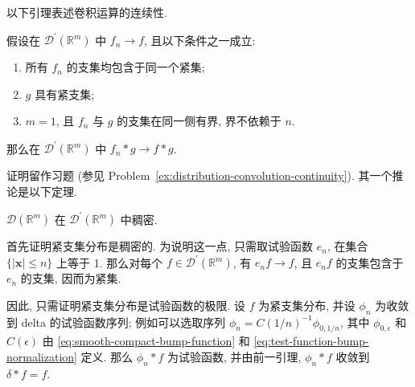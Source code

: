 以下引理表述卷积运算的连续性.

\begin{Lemma}
\label{lem:distribution-convolution-continuity}
假设在 $\mathcal{D}^{\prime}(\mathbb{R}^m)$ 中 $f_n\to f$, 且以下条件之一成立:
\begin{enumerate}
\item 所有 $f_n$ 的支集均包含于同一个紧集;
\item $g$ 具有紧支集;
\item $m=1$, 且 $f_n$ 与 $g$ 的支集在同一侧有界, 界不依赖于 $n$.
\end{enumerate}
那么在 $\mathcal{D}^{\prime}(\mathbb{R}^m)$ 中 $f_n*g\to f*g$.
\end{Lemma}

证明留作习题 (参见 Problem~\ref{ex:distribution-convolution-continuity}). 其一个推论是以下定理.

\begin{Theorem}
\label{thm:test-functions-dense-distributions}
$\mathcal{D}(\mathbb{R}^m)$ 在 $\mathcal{D}^{\prime}(\mathbb{R}^m)$ 中稠密.
\end{Theorem}

\begin{Proof}
首先证明紧支集分布是稠密的. 为说明这一点, 只需取试验函数 $e_n$, 在集合 $\{|\bm{x}|\leq n\}$ 上等于 1. 那么对每个 $f\in\mathcal{D}^{\prime}(\mathbb{R}^m)$, 有 $e_nf\to f$, 且 $e_nf$ 的支集包含于 $e_n$ 的支集, 因而为紧集.

因此, 只需证明紧支集分布是试验函数的极限. 设 $f$ 为紧支集分布, 并设 $\phi_n$ 为收敛到 delta 的试验函数序列; 例如可以选取序列 $\phi_n=C(1/n)^{-1}\phi_{0,1/n}$, 其中 $\phi_{0,\epsilon}$ 和 $C(\epsilon)$ 由 \eqref{eq:smooth-compact-bump-function} 和 \eqref{eq:test-function-bump-normalization} 定义. 那么 $\phi_n*f$ 为试验函数, 并由前一引理, $\phi_n*f$ 收敛到 $\delta*f=f$.
\end{Proof}
